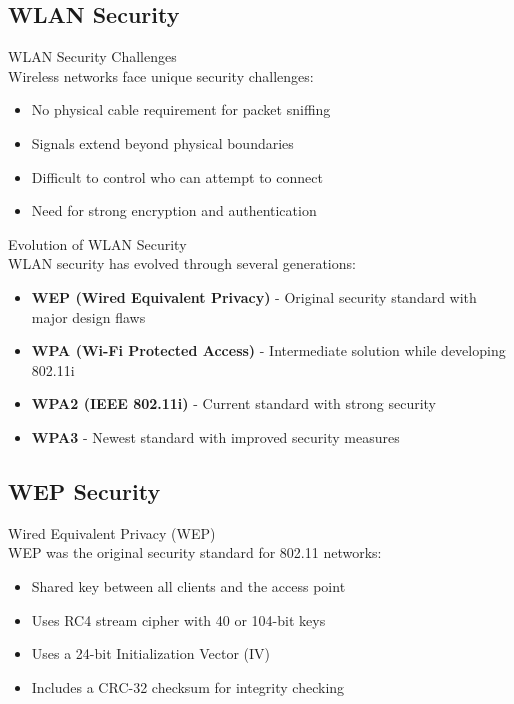 \subsection{WLAN Security}

\begin{definition}{WLAN Security Challenges}\\
Wireless networks face unique security challenges:
\begin{itemize}
    \item No physical cable requirement for packet sniffing
    \item Signals extend beyond physical boundaries
    \item Difficult to control who can attempt to connect
    \item Need for strong encryption and authentication
\end{itemize}
\end{definition}

\begin{concept}{Evolution of WLAN Security}\\
WLAN security has evolved through several generations:
\begin{itemize}
    \item \textbf{WEP (Wired Equivalent Privacy)} - Original security standard with major design flaws
    \item \textbf{WPA (Wi-Fi Protected Access)} - Intermediate solution while developing 802.11i
    \item \textbf{WPA2 (IEEE 802.11i)} - Current standard with strong security
    \item \textbf{WPA3} - Newest standard with improved security measures
\end{itemize}
\end{concept}

\subsection{WEP Security}

\begin{definition}{Wired Equivalent Privacy (WEP)}\\
WEP was the original security standard for 802.11 networks:
\begin{itemize}
    \item Shared key between all clients and the access point
    \item Uses RC4 stream cipher with 40 or 104-bit keys
    \item Uses a 24-bit Initialization Vector (IV)
    \item Includes a CRC-32 checksum for integrity checking
\end{itemize}
\end{definition}

